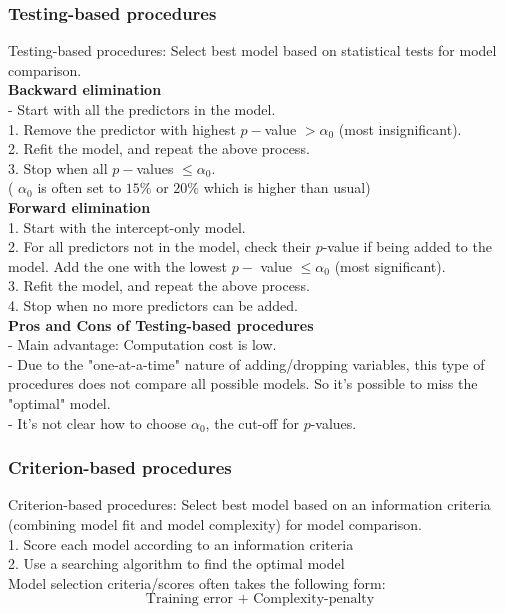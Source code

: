 \documentclass[11pt,a4paper]{article}
\begin{document}
\subsubsection{Testing-based procedures}
Testing-based procedures: Select best model based on statistical tests for model comparison.\\
\textbf{Backward elimination}\\
- Start with all the predictors in the model.\\
1. Remove the predictor with highest $p-$value $>\alpha_{0}$ (most insignificant).\\
2. Refit the model, and repeat the above process.\\
3. Stop when all $p-$values $\leq \alpha_{0}$.\\
( $\alpha_{0}$ is often set to $15 \%$ or $20 \%$ which is higher than usual)\\
\textbf{Forward elimination}\\
1. Start with the intercept-only model.\\
2. For all predictors not in the model, check their $p$-value if being added to the model. Add the one with the lowest $p-$ value $\leq \alpha_{0}$ (most significant).\\
3. Refit the model, and repeat the above process.\\
4. Stop when no more predictors can be added.\\

\textbf{Pros and Cons of Testing-based procedures}\\
- Main advantage: Computation cost is low.\\
- Due to the "one-at-a-time" nature of adding/dropping variables, this type of procedures does not compare all possible models. So it's possible to miss the "optimal" model.\\
- It's not clear how to choose $\alpha_{0}$, the cut-off for $p$-values.\\

\subsubsection{Criterion-based procedures}
Criterion-based procedures: Select best model based on an information criteria (combining model ﬁt and model complexity) for model comparison.\\
1. Score each model according to an information criteria\\
2. Use a searching algorithm to find the optimal model\\
Model selection criteria/scores often takes the following form:
$$\text{Training error + Complexity-penalty}$$
\end{document}
